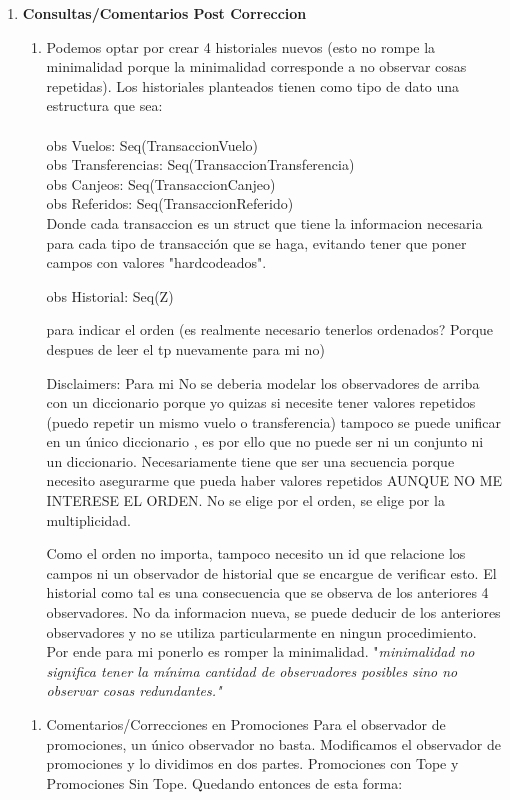 \documentclass[11pt,a4paper]{article}
\begin{document}
\begin{enumerate}
	\item \textbf{Consultas/Comentarios Post Correccion}
	\begin{enumerate}
		\item Podemos optar por crear 4 historiales nuevos (esto no rompe la minimalidad porque la minimalidad corresponde a no observar cosas repetidas). Los historiales planteados tienen como tipo de dato una estructura que sea: \\ \\
		obs Vuelos: Seq(TransaccionVuelo) \\
		obs Transferencias: Seq(TransaccionTransferencia)\\
		obs Canjeos: Seq(TransaccionCanjeo)\\
		obs Referidos: Seq(TransaccionReferido)\\

		Donde cada transaccion es un struct que tiene la informacion necesaria para cada tipo de transacción que se haga, evitando tener que poner campos con valores "hardcodeados".

		obs Historial: Seq(Z)

		para indicar el orden (es realmente necesario tenerlos ordenados? Porque despues de leer el tp nuevamente para mi no)

		Disclaimers:
		Para mi No se deberia modelar los observadores de arriba con un diccionario porque yo quizas si necesite tener valores repetidos (puedo repetir un mismo vuelo o transferencia) tampoco se puede unificar en un único diccionario , es por ello que no puede ser ni un conjunto ni un diccionario. Necesariamente tiene que ser una secuencia porque necesito asegurarme que pueda haber valores repetidos AUNQUE NO ME INTERESE EL ORDEN. No se elige por el orden, se elige por la multiplicidad.

		Como el orden no importa, tampoco necesito un id que relacione los campos ni un observador de historial que se encargue de verificar esto. El historial como tal es una consecuencia que se observa de los anteriores 4 observadores. No da informacion nueva, se puede deducir de los anteriores observadores y no se utiliza particularmente en ningun procedimiento. Por ende para mi ponerlo es romper la minimalidad. "\textit{minimalidad no significa tener la mínima cantidad de observadores posibles sino no observar cosas redundantes."}
	\end{enumerate}
	\begin{enumerate}
		\item Comentarios/Correcciones en Promociones
		Para el observador de promociones, un único observador no basta. Modificamos el observador de promociones y lo dividimos en dos partes. Promociones con Tope y Promociones Sin Tope. Quedando entonces de esta forma: \\


\end{enumerate}
\end{enumerate}
\end{document}
